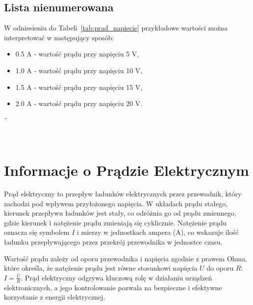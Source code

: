 \subsection{Lista nienumerowana}
W odniesieniu do Tabeli~\ref{tab:prad_napiecie} przykładowe wartości można interpretować w następujący sposób:
\begin{itemize}
    \item 0.5 A - wartość prądu przy napięciu 5 V,
    \item 1.0 A - wartość prądu przy napięciu 10 V,
    \item 1.5 A - wartość prądu przy napięciu 15 V,
    \item 2.0 A - wartość prądu przy napięciu 20 V.
\end{itemize}
\~\

\
\section{Informacje o Prądzie Elektrycznym}

Prąd elektryczny to przepływ ładunków elektrycznych przez przewodnik, który zachodzi pod wpływem przyłożonego napięcia. W układach prądu stałego, kierunek przepływu ładunków jest stały, co odróżnia go od prądu zmiennego, gdzie kierunek i natężenie prądu zmieniają się cyklicznie. Natężenie prądu oznacza się symbolem \( I \) i mierzy w jednostkach ampera (A), co wskazuje ilość ładunku przepływającego przez przekrój przewodnika w jednostce czasu.

Wartość prądu zależy od oporu przewodnika i napięcia zgodnie z prawem Ohma, które określa, że natężenie prądu jest równe stosunkowi napięcia \( U \) do oporu \( R \): \( I = \frac{U}{R} \). Prąd elektryczny odgrywa kluczową rolę w działaniu urządzeń elektronicznych, a jego kontrolowanie pozwala na bezpieczne i efektywne korzystanie z energii elektrycznej.


\begin{center}
    
\end{center}

